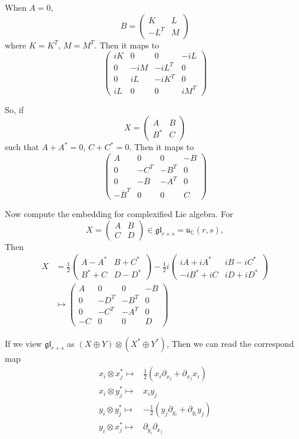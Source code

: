 \documentclass[12pt]{article}
\def\bC{{\mathbb{C}}}
\def\agl{\mathfrak{gl}}
\def\fuu{\mathfrak{u}}
\begin{document}
When $A=0$,
\[
B =\begin{pmatrix}
K & L\\
-L^T & M  
\end{pmatrix}
\]
where $K = K^T$, $M=M^T$.
Then it maps to 
\[
\begin{pmatrix}
iK & 0 & 0 & -iL \\
0 & -iM & -iL^T & 0\\
0 & iL & -iK^T & 0\\
iL& 0 & 0 & iM^T
\end{pmatrix}
\]

So, if 
\[
X = \begin{pmatrix}
A & B\\
B^* & C
\end{pmatrix}
\] such that $A+A^*=0$, $C+C^*=0$.
Then it maps to 
\[
\begin{pmatrix}
A & 0 & 0 & -B\\
0 & -C^T & -B^T & 0\\
0 & -\overline{B} & -A^T & 0 \\
-\overline{B}^T & 0&  0& C  
\end{pmatrix}
\]

Now compute the embedding for complexified Lie algebra.
For 
\[X = 
\begin{pmatrix}
A & B\\
C & D
\end{pmatrix}
\in \agl_{r+s} = \fuu_\bC(r,s), 
\]
Then 
\[
\begin{split}
X &= \frac{1}{2}\begin{pmatrix}
A-A^* & B+C^*\\
B^*+C & D-D^*
\end{pmatrix}
- \frac{1}{2}i
\begin{pmatrix}
iA+iA^* & iB-iC^*\\
-iB^*+iC & iD+iD^*
\end{pmatrix}\\
&\mapsto
\begin{pmatrix}
A & 0 & 0 & -B \\
0 & -D^T & -B^T & 0\\
0 & -C^T & -A^T & 0 \\
-C& 0   & 0 & D
\end{pmatrix}
\end{split}
\]

If we view $\agl_{r+s}$ as $(X\oplus Y)\otimes (X^*\oplus Y^*)$, 
Then we can read the correspond map 
\begin{align*}
x_i\otimes x_j^* \mapsto&
 \frac{1}{2}(x_i \partial_{x_j} + \partial_{x_j} x_i)\\ 
x_i\otimes y_j^* \mapsto&
 x_iy_j\\ 
y_i\otimes y_j^* \mapsto&
- \frac{1}{2}(y_j \partial_{y_i} + \partial_{y_i} y_j)\\ 
y_i\otimes x_j^* \mapsto&
\partial_{y_i}\partial_{x_j}
\end{align*}
\end{document}
